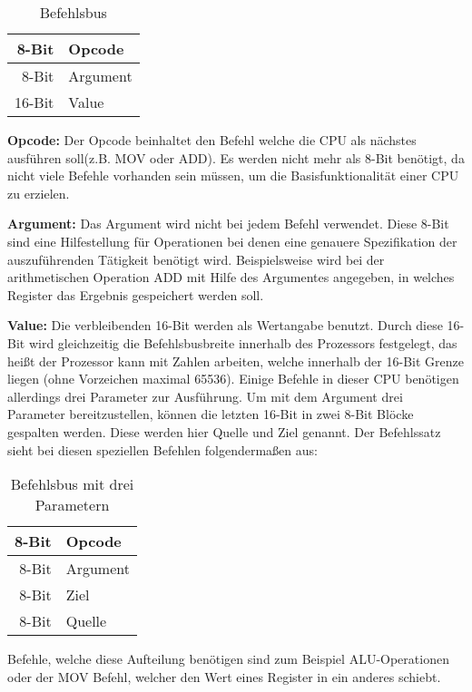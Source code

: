 \documentclass[12pt]{article}
\begin{document}
\begin{table}[!htb]
\centering
\label{Befehlsbus}
\begin{tabular}{|r|l|}
  \hline
  8-Bit & Opcode \\
  \hline
  8-Bit & Argument \\ 
  \hline
  16-Bit & Value\\
  \hline
  
\end{tabular}
\caption{Befehlsbus}
\end{table}
\par\bigskip\noindent\textbf{Opcode: } Der Opcode beinhaltet den Befehl welche die CPU als nächstes ausführen soll(z.B. MOV oder ADD). Es werden nicht mehr als 8-Bit benötigt, da nicht viele Befehle vorhanden sein müssen, um die Basisfunktionalität einer CPU zu erzielen.
\par\bigskip\noindent\textbf{Argument: } Das Argument wird nicht bei jedem Befehl verwendet. Diese 8-Bit sind eine Hilfestellung für Operationen bei denen eine genauere Spezifikation der auszuführenden Tätigkeit benötigt wird. Beispielsweise wird bei der arithmetischen Operation ADD mit Hilfe des Argumentes angegeben, in welches Register das Ergebnis gespeichert werden soll.
\par\bigskip\noindent\textbf{Value: } Die verbleibenden 16-Bit werden als Wertangabe benutzt. Durch diese 16-Bit wird gleichzeitig die Befehlsbusbreite innerhalb des Prozessors festgelegt, das heißt der Prozessor kann mit Zahlen arbeiten, welche innerhalb der 16-Bit Grenze liegen (ohne Vorzeichen maximal 65536). Einige Befehle in dieser CPU benötigen allerdings drei Parameter zur Ausführung. Um mit dem Argument drei Parameter bereitzustellen, können die letzten 16-Bit in zwei 8-Bit Blöcke gespalten werden. Diese werden hier Quelle und Ziel genannt. Der Befehlssatz sieht bei diesen speziellen Befehlen folgendermaßen aus: 
\begin{table}[!htb]
\centering
\begin{tabular}{|r|l|}
  \hline
  8-Bit & Opcode \\
  \hline
  8-Bit & Argument \\ 
  \hline
  8-Bit & Ziel\\
  \hline
  8-Bit & Quelle\\
  \hline
\end{tabular}
\caption{Befehlsbus mit drei Parametern}
\label{Befehlsbus3P}
\end{table}
\newline
Befehle, welche diese Aufteilung benötigen sind zum Beispiel ALU-Operationen oder der MOV Befehl, welcher den Wert eines Register in ein anderes schiebt.
\end{document}
